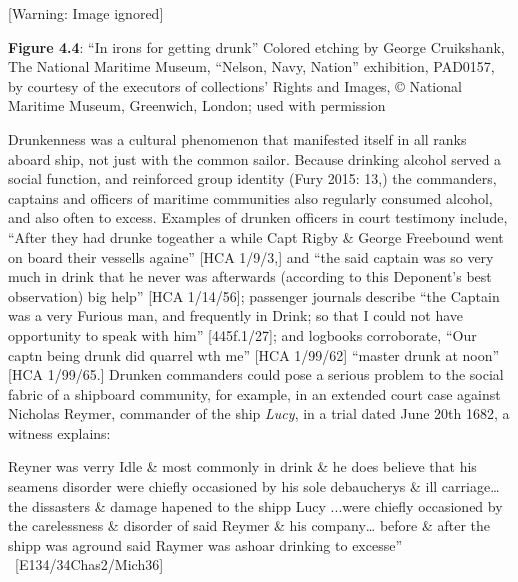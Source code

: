 \begin{center}
 [Warning: Image ignored] %

\end{center}
\begin{styleStandard}
\textbf{Figure 4.4}: “In irons for getting drunk” Colored etching by George Cruikshank, The National Maritime Museum, “Nelson, Navy, Nation” exhibition, PAD0157, by courtesy of the executors of collections’ Rights and Images, © National Maritime Museum, Greenwich, London; used with permission
\end{styleStandard}

\begin{styleStandard}
Drunkenness was a cultural phenomenon that manifested itself in all ranks aboard ship, not just with the common sailor. Because drinking alcohol served a social function, and reinforced group identity (Fury 2015: 13,) the commanders, captains and officers of maritime communities also regularly consumed alcohol, and also often to excess. Examples of drunken officers in court testimony include, “After they had drunke togeather a while Capt Rigby \& George Freebound went on board their vessells againe” [HCA 1/9/3,] and “the said captain was so very much in drink that he never was afterwards (according to this Deponent’s best observation) big help” [HCA 1/14/56]; passenger journals describe “the Captain was a very Furious man, and frequently in Drink; so that I could not have opportunity to speak with him” [445f.1/27]; and logbooks corroborate, “Our captn being drunk did quarrel wth me” [HCA 1/99/62] “master drunk at noon” [HCA 1/99/65.] Drunken commanders could pose a serious problem to the social fabric of a shipboard community, for example, in an extended court case against Nicholas Reymer, commander of the ship \textit{Lucy}, in a trial dated June 20th 1682, a witness explains:
\end{styleStandard}

\begin{styleStandard}
Reyner was verry Idle \& most commonly in drink \& he does believe that his seamens disorder were chiefly occasioned by his sole debaucherys \& ill carriage… the dissasters \& damage hapened to the shipp Lucy ...were chiefly occasioned by the carelessness \& disorder of said Reymer \& his company… before \& after the shipp was aground said Raymer was ashoar drinking to excesse” \ [E134/34Chas2/Mich36]
\end{styleStandard}

